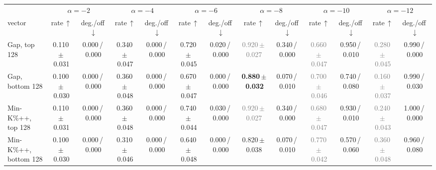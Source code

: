 \begin{tabular}{@{}lcccccccccccc@{}}
\toprule
& \multicolumn{2}{c}{$\alpha=-2$} & \multicolumn{2}{c}{$\alpha=-4$} & \multicolumn{2}{c}{$\alpha=-6$} & \multicolumn{2}{c}{$\alpha=-8$} & \multicolumn{2}{c}{$\alpha=-10$} & \multicolumn{2}{c}{$\alpha=-12$} \\
\cmidrule(lr){2-3}\cmidrule(lr){4-5}\cmidrule(lr){6-7}\cmidrule(lr){8-9}\cmidrule(lr){10-11}\cmidrule(lr){12-13}
vector & rate\,$\uparrow$ & deg./off\,$\downarrow$ & rate\,$\uparrow$ & deg./off\,$\downarrow$ & rate\,$\uparrow$ & deg./off\,$\downarrow$ & rate\,$\uparrow$ & deg./off\,$\downarrow$ & rate\,$\uparrow$ & deg./off\,$\downarrow$ & rate\,$\uparrow$ & deg./off\,$\downarrow$ \\
\midrule
Gap, top 128 & 0.110\,{\scriptsize$\pm$\,0.031} & {\scriptsize 0.000\,/\,0.000} & 0.340\,{\scriptsize$\pm$\,0.047} & {\scriptsize 0.000\,/\,0.000} & 0.720\,{\scriptsize$\pm$\,0.045} & {\scriptsize 0.020\,/\,0.000} & \textcolor{gray}{0.920\,{\scriptsize$\pm$\,0.027}} & {\scriptsize 0.340\,/\,0.000} & \textcolor{gray}{0.660\,{\scriptsize$\pm$\,0.047}} & {\scriptsize 0.950\,/\,0.010} & \textcolor{gray}{0.280\,{\scriptsize$\pm$\,0.045}} & {\scriptsize 0.990\,/\,0.000} \\
Gap, bottom 128 & 0.100\,{\scriptsize$\pm$\,0.030} & {\scriptsize 0.000\,/\,0.000} & 0.360\,{\scriptsize$\pm$\,0.048} & {\scriptsize 0.000\,/\,0.000} & 0.670\,{\scriptsize$\pm$\,0.047} & {\scriptsize 0.000\,/\,0.000} & \textbf{0.880\,{\scriptsize$\pm$\,0.032}} & {\scriptsize 0.070\,/\,0.010} & \textcolor{gray}{0.700\,{\scriptsize$\pm$\,0.046}} & {\scriptsize 0.740\,/\,0.080} & \textcolor{gray}{0.160\,{\scriptsize$\pm$\,0.037}} & {\scriptsize 0.990\,/\,0.030} \\
Min-K\%++, top 128 & 0.110\,{\scriptsize$\pm$\,0.031} & {\scriptsize 0.000\,/\,0.000} & 0.360\,{\scriptsize$\pm$\,0.048} & {\scriptsize 0.000\,/\,0.000} & 0.740\,{\scriptsize$\pm$\,0.044} & {\scriptsize 0.030\,/\,0.000} & \textcolor{gray}{0.920\,{\scriptsize$\pm$\,0.027}} & {\scriptsize 0.340\,/\,0.000} & \textcolor{gray}{0.680\,{\scriptsize$\pm$\,0.047}} & {\scriptsize 0.930\,/\,0.010} & \textcolor{gray}{0.240\,{\scriptsize$\pm$\,0.043}} & {\scriptsize 1.000\,/\,0.000} \\
Min-K\%++, bottom 128 & 0.100\,{\scriptsize$\pm$\,0.030} & {\scriptsize 0.000\,/\,0.000} & 0.310\,{\scriptsize$\pm$\,0.046} & {\scriptsize 0.000\,/\,0.000} & 0.640\,{\scriptsize$\pm$\,0.048} & {\scriptsize 0.000\,/\,0.000} & 0.820\,{\scriptsize$\pm$\,0.038} & {\scriptsize 0.070\,/\,0.010} & \textcolor{gray}{0.770\,{\scriptsize$\pm$\,0.042}} & {\scriptsize 0.570\,/\,0.060} & \textcolor{gray}{0.360\,{\scriptsize$\pm$\,0.048}} & {\scriptsize 0.960\,/\,0.080} \\

\end{tabular}
